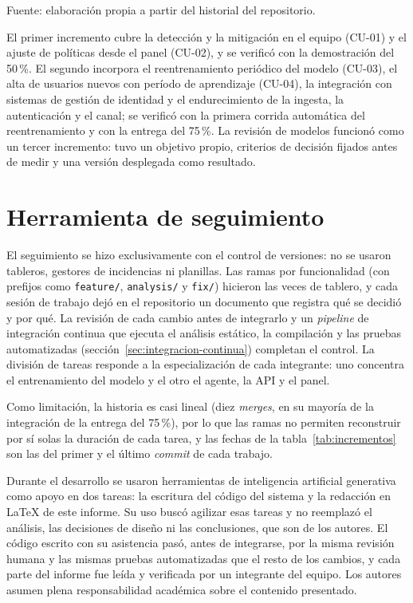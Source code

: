 {\small Fuente: elaboración propia a partir del historial del repositorio.\par}

El primer incremento cubre la detección y la mitigación en el equipo (CU-01) y el ajuste de políticas desde el panel (CU-02), y se verificó con la demostración del 50\,\%. El segundo incorpora el reentrenamiento periódico del modelo (CU-03), el alta de usuarios nuevos con período de aprendizaje (CU-04), la integración con sistemas de gestión de identidad y el endurecimiento de la ingesta, la autenticación y el canal; se verificó con la primera corrida automática del reentrenamiento y con la entrega del 75\,\%. La revisión de modelos funcionó como un tercer incremento: tuvo un objetivo propio, criterios de decisión fijados antes de medir y una versión desplegada como resultado.

\section{Herramienta de seguimiento}
El seguimiento se hizo exclusivamente con el control de versiones: no se usaron tableros, gestores de incidencias ni planillas. Las ramas por funcionalidad (con prefijos como \texttt{feature/}, \texttt{analysis/} y \texttt{fix/}) hicieron las veces de tablero, y cada sesión de trabajo dejó en el repositorio un documento que registra qué se decidió y por qué. La revisión de cada cambio antes de integrarlo y un \emph{pipeline} de integración continua que ejecuta el análisis estático, la compilación y las pruebas automatizadas (sección~\ref{sec:integracion-continua}) completan el control. La división de tareas responde a la especialización de cada integrante: uno concentra el entrenamiento del modelo y el otro el agente, la API y el panel.

Como limitación, la historia es casi lineal (diez \emph{merges}, en su mayoría de la integración de la entrega del 75\,\%), por lo que las ramas no permiten reconstruir por sí solas la duración de cada tarea, y las fechas de la tabla~\ref{tab:incrementos} son las del primer y el último \emph{commit} de cada trabajo.

Durante el desarrollo se usaron herramientas de inteligencia artificial generativa como apoyo en dos tareas: la escritura del código del sistema y la redacción en LaTeX de este informe. Su uso buscó agilizar esas tareas y no reemplazó el análisis, las decisiones de diseño ni las conclusiones, que son de los autores. El código escrito con su asistencia pasó, antes de integrarse, por la misma revisión humana y las mismas pruebas automatizadas que el resto de los cambios, y cada parte del informe fue leída y verificada por un integrante del equipo. Los autores asumen plena responsabilidad académica sobre el contenido presentado.

